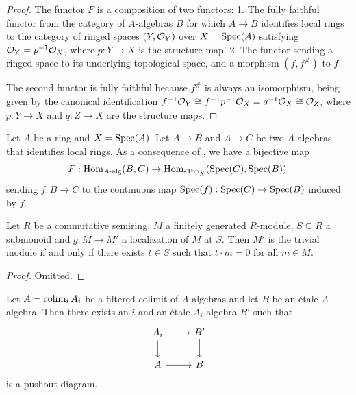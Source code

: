 \begin{proof}
The functor \(F\) is a composition of two functors:
1. The fully faithful functor from the category of \(A\)-algebras \(B\) for which \(A \to B\) identifies local rings to the category of ringed spaces \((Y, {\mathcal{O}}_Y)\) over \(X = \operatorname{Spec}(A)\) satisfying \({\mathcal{O}}_Y = p^{-1}{\mathcal{O}}_X\), where \(p: Y \to X\) is the structure map.
2. The functor sending a ringed space to its underlying topological space, and a morphism \((f, f^\#)\) to \(f\).

The second functor is fully faithful because \(f^\#\) is always an isomorphism, being given by the canonical identification \(f^{-1}{\mathcal{O}}_Y \cong f^{-1}p^{-1}{\mathcal{O}}_X = q^{-1}{\mathcal{O}}_X \cong {\mathcal{O}}_Z\), where \(p: Y \to X\) and \(q: Z \to X\) are the structure maps.
\end{proof}

\begin{definition}
  \label{def:identifies-local-ring-hom-set-bijection}
  Let \(A\) be a ring and \(X = \operatorname{Spec}(A)\). Let \(A \to B\) and \(A \to C\) be two \(A\)-algebras that identifies local rings. As a consequence of , we have a bijective map 
  \[F : \operatorname{Hom}_{A\textnormal{-alg}}(B, C) \to \operatorname{Hom}_{\textnormal{-Top}_X}(\operatorname{Spec}(C), \operatorname{Spec}(B)).\]
  sending \(f : B \to C\) to the continuous map \(\operatorname{Spec}(f) : \operatorname{Spec}(C) \to \operatorname{Spec}(B)\) induced by \(f\).
\end{definition}

\begin{lemma}
    Let $R$ be a commutative semiring, $M$ a finitely generated $R$-module, $S \subseteq R$ a submonoid
    and $g \colon M \to M'$ a localization of $M$ at $S$. Then $M'$ is the trivial module if and only if
    there exists $t \in S$ such that $t \cdot m = 0$ for all $m \in M$.
    \label{lemma:fg-localization-subsingleton-uniform-annihilator}
    \leanok
\end{lemma}

\begin{proof}
    \leanok
    Omitted.
\end{proof}

\begin{lemma}
    Let $A = \operatorname{colim}_i A_i$ be a filtered colimit of $A$-algebras and let $B$ be an étale $A$-algebra. Then
    there exists an $i$ and an étale $A_i$-algebra $B'$ such that
    \[
    \begin{tikzcd}
        A_i \arrow{r} \arrow{d} & B' \arrow{d} \\
        A \arrow{r} & B
    \end{tikzcd}
    \] is a pushout diagram.
    \label{lemma:etale-ind-spreads}
\end{lemma}

